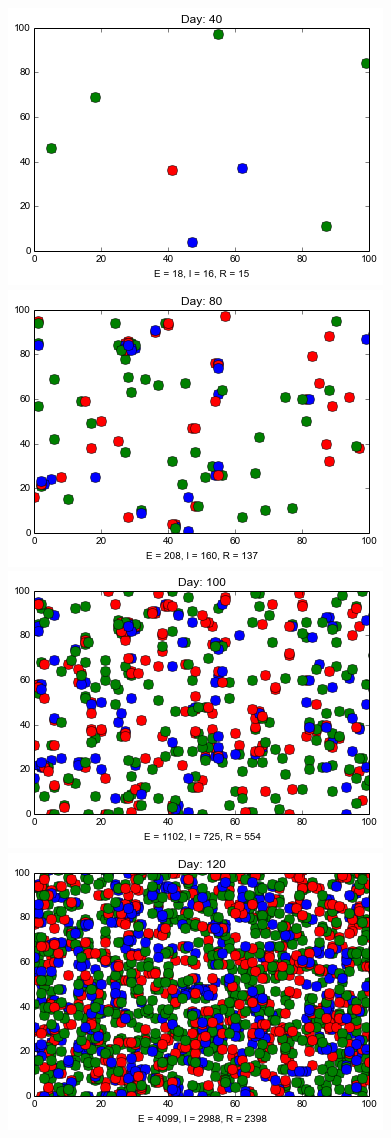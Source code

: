 \begin{minipage}{\linewidth}
\medskip
\includegraphics[scale=0.28]{images/2t40.png} \quad
\includegraphics[scale=0.28]{images/2t80.png} \quad
\includegraphics[scale=0.28]{images/2t100.png} \quad
\includegraphics[scale=0.28]{images/2t120.png} 


\end{minipage}
